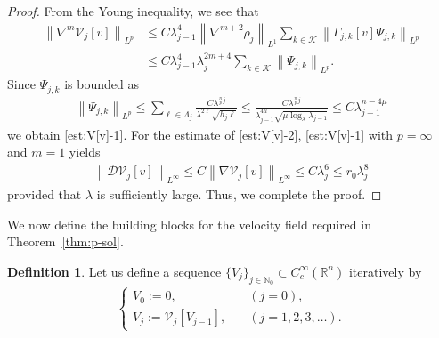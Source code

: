 \documentclass[a4paper,12pt,reqno]{amsart}
\theoremstyle{plain}
\theoremstyle{definition}
\newtheorem{df}[thm]{Definition}
\renewcommand{\leq}{\leqslant}
\newcommand{\n}[1]{{\left\|#1\right\|}}
\newcommand{\R}{\mathbb{R}}
\newcommand{\N}{\mathbb{N}}
\begin{document}
\begin{proof}
    From the Young inequality, we see that 
    \begin{align}
        \n{\nabla^m{\mathcal{V}}_j[v]}_{L^{p}}
        &
        \leq 
        C
        \lambda_{j-1}^4
        \n{\nabla^{m+2}\rho_j}_{L^1}
        \sum_{k \in \mathcal{K}}
        \n{\Gamma_{j,k}[v]\Psi_{j,k}}_{L^p}
        \\
        &
        \leq 
        C
        \lambda_{j-1}^4
        \lambda_j^{2m+4}
        \sum_{k \in \mathcal{K}}
        \n{\Psi_{j,k}}_{L^p}.
    \end{align}
    Since $\Psi_{j,k}$ is bounded as
    \begin{align}
        \n{\Psi_{j,k}}_{L^p}
        \leq 
        \sum_{\ell \in \Lambda_j}
        \frac{C\lambda^{\frac{n}{p}j}}{\lambda^{2\ell}\sqrt{h_j\ell}}
        \leq 
        \frac{C\lambda^{\frac{n}{p}j}}{\lambda^{4\mu}_{j-1}\sqrt{\mu\log_{\lambda}\lambda_{j-1}}}
        \leq 
        C
        \lambda^{n-4\mu}_{j-1}
    \end{align}
    we obtain \eqref{est:V[v]-1}.
    For the estimate of \eqref{est:V[v]-2}, \eqref{est:V[v]-1} with $p=\infty$ and $m=1$ yields
    \begin{align}
        \n{\mathcal{D}\mathcal{V}_j[v]}_{L^\infty}
        \leq 
        C\n{\nabla\mathcal{V}_j[v]}_{L^\infty}
        \leq 
        C\lambda_j^6
        \leq 
        r_0\lambda_j^{8}
    \end{align}
    provided that $\lambda$ is sufficiently large.
    Thus, we complete the proof.
\end{proof}
We now define the building blocks for the velocity field required in Theorem~\ref{thm:p-sol}.
\begin{df}\label{df:V_j}
    Let us define a sequence $\{{V}_j\}_{j \in \N_0} \subset C_c^{\infty}(\R^n)$ iteratively by 
    \begin{align}
        \begin{cases}
            {V}_0:=0, & (j=0), \\
            {V}_j:={\mathcal{V}}_j[{V}_{j-1}], \quad & (j = 1,2,3,\dots).
        \end{cases}
    \end{align}
\end{df}
\end{document}

